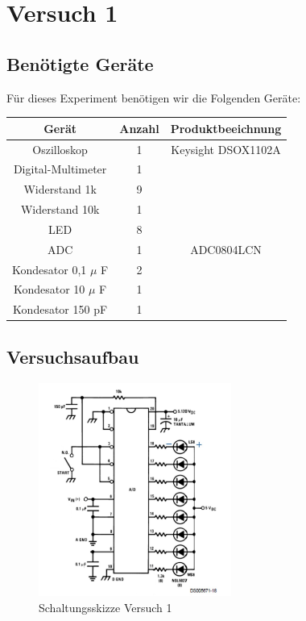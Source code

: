\chapter{Versuch 1}

\section{Benötigte Geräte}

Für dieses Experiment benötigen wir die Folgenden Geräte:

\begin{tabular}[h]{c|c|c}
    Gerät & Anzahl & Produktbeeichnung\\
    \hline
    Oszilloskop & 1  & Keysight DSOX1102A\\
    \hline
	Digital-Multimeter & 1 & \\
	\hline 
	Widerstand 1k & 9 &  \\
	\hline 
	Widerstand 10k & 1 &  \\
	\hline
	LED & 8 & \\
	\hline
	ADC & 1 & ADC0804LCN \\
	\hline
	Kondesator 0,1 $\mu$ F & 2 & \\
	\hline
	Kondesator 10 $\mu$ F & 1 & \\
	\hline
	Kondesator 150 pF & 1 & 
        \label{tab:Materialliste Versuch 1}
\end{tabular}

\section{Versuchsaufbau}


\begin{figure}[H]
	\centering
	\includegraphics[height=7cm]{images/Schaltungsskizze-versuch-eins.jpg} 
	\caption[]{Schaltungsskizze Versuch 1}
\end{figure}

